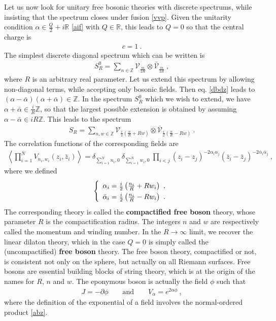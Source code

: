 \documentclass[12pt,a4paper,notitlepage]{report}
\numberwithin{equation}{section}
\theoremstyle{break}
\begin{document}
Let us now look for unitary free bosonic theories with discrete spectrums, while insisting that the spectrum closes under fusion \eqref{vvp}.
Given the unitarity condition $\alpha\in \frac{Q}{2}+i{\mathbb{R}}$ \eqref{aif} with $Q\in {\mathbb{R}}$, this leads to $Q=0$ so that the central charge is 
\begin{align}
 c=1\ .
\end{align}
The simplest discrete diagonal spectrum which can be written is 
\begin{align}
 S_R^0=\sum_{n\in{\mathbb{Z}}} \mathcal{V}_{\frac{in}{2R}}\otimes \bar{\mathcal{V}}_{\frac{in}{2R}}\ ,
\end{align}
where $R$ is an arbitrary real parameter.
Let us extend this spectrum by allowing non-diagonal terms, while accepting only bosonic fields.
Then eq. \eqref{dbdz} leads to $(\alpha-\bar{\alpha})(\alpha+\bar{\alpha})\in {\mathbb{Z}}$.
In the spectrum $S_R^0$ which we wish to extend, we have $\alpha+\bar{\alpha}\in\frac{i}{R}{\mathbb{Z}}$, so that the largest possible extension is obtained by assuming $\alpha-\bar{\alpha}\in iR{\mathbb{Z}}$.
This leads to the spectrum
\begin{align}
 \boxed{S_R = \sum_{n,w\in {\mathbb{Z}}} \mathcal{V}_{\frac{i}{2}\left(\frac{n}{R} + Rw\right)} \otimes \bar{\mathcal{V}}_{\frac{i}{2}\left(\frac{n}{R} - Rw\right)} }\ .
\label{sr}
\end{align}
The correlation functions of the corresponding fields are 
\begin{align}
 \left\langle \prod_{i=1}^N V_{n_i,w_i}(z_i,\bar{z}_i) \right\rangle = \delta_{\sum_{i=1}^N n_i,0}\ \delta_{\sum_{i=1}^N w_i,0}\ \prod_{i<j} (z_i-z_j)^{-2\alpha_i\alpha_j}(\bar{z}_i-\bar{z}_j)^{-2\bar{\alpha}_i\bar{\alpha}_j}\ , 
\end{align}
where we defined
\begin{align}
\renewcommand{\arraystretch}{1.3}
\left\{\begin{array}{l}  \alpha_i = \frac{i}{2}\left(\frac{n_i}{R} + Rw_i \right)\ , \\ \bar{\alpha}_i = \frac{i}{2}\left(\frac{n_i}{R} - Rw_i \right) \ . \end{array}\right. 
\end{align}
The corresponding theory is called the \textbf{\boldmath compactified free boson} theory, whose parameter $R$ is  the compactification radius.
The integers $n$ and $w$ are respectively called the momentum and winding number.
In the $R\rightarrow \infty$ limit, we recover the linear dilaton theory, which in the case $Q=0$ is simply called the (uncompactified) \textbf{\boldmath free boson} theory. 
The free boson theory, compactified or not, is consistent not only on the sphere, but actually on all Riemann surfaces.
Free bosons are essential building blocks of string theory, which is at the origin of the names for $R$, $n$ and $w$.
The eponymous boson is actually the field $\phi$ such that 
\begin{align}
 J = -\partial \phi \qquad \text{and} \qquad V_\alpha = e^{2\alpha\phi}\ ,
\label{jpf}
\end{align}
where the definition of the exponential of a field involves the normal-ordered product \eqref{abz}. 
\end{document}
